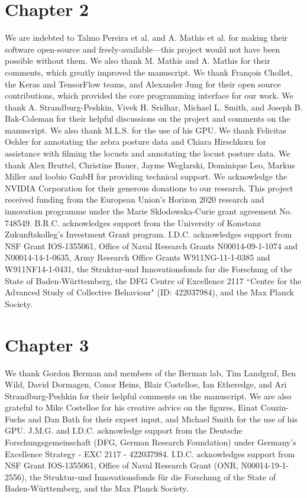 \documentclass[11pt,a4paper,oneside]{book}
\begin{document}
\begin{doublespace}
\section*{Chapter 2}
We are indebted to Talmo Pereira et al. and A. Mathis et al. for making their software open-source and freely-available---this project would not have been possible without them. We also thank M. Mathis and A. Mathis for their comments, which greatly improved the manuscript. We thank Fran\c{c}ois Chollet, the Keras and TensorFlow teams, and Alexander Jung for their open source contributions, which provided the core programming interface for our work. We thank A. Strandburg-Peshkin, Vivek H. Sridhar, Michael L. Smith, and Joseph B. Bak-Coleman for their helpful discussions on the project and comments on the manuscript. We also thank M.L.S. for the use of his GPU. We thank Felicitas Oehler for annotating the zebra posture data and Chiara Hirschkorn for assistance with filming the locusts and annotating the locust posture data. We thank Alex Bruttel, Christine Bauer, Jayme Weglarski, Dominique Leo, Markus Miller and loobio GmbH for providing technical support. We acknowledge the NVIDIA Corporation for their generous donations to our research. This project received funding from the European Union's Horizon 2020 research and innovation programme under the Marie Sklodowska-Curie grant agreement No. 748549. B.R.C. acknowledges support from the University of Konstanz Zukunftskolleg's Investment Grant program. I.D.C. acknowledges support from NSF Grant IOS-1355061, Office of Naval Research Grants N00014-09-1-1074 and N00014-14-1-0635, Army Research Office Grants W911NG-11-1-0385 and W911NF14-1-0431, the Struktur-und Innovationsfonds fur die Forschung of the State of Baden-W\"urttemberg, the DFG Centre of Excellence 2117 “Centre for the Advanced Study of Collective Behaviour" (ID: 422037984), and the Max Planck Society.

\section*{Chapter 3}
We thank Gordon Berman and members of the Berman lab, Tim Landgraf, Ben Wild, David Dormagen, Conor Heins, Blair Costelloe, Ian Etheredge, and Ari Strandburg-Peshkin for their helpful comments on the manuscript. We are also grateful to Mike Costelloe for his creative advice on the figures, Einat Couzin-Fuchs and Dan Bath for their expert input, and Michael Smith for the use of his GPU. J.M.G. and I.D.C. acknowledge support from the Deutsche Forschungsgemeinschaft
(DFG, German Research Foundation) under Germany’s Excellence Strategy - EXC 2117 - 422037984. I.D.C. acknowledges support from NSF Grant IOS-1355061, Office of Naval Research Grant (ONR, N00014-19-1-2556), the Struktur-und Innovationsfonds f\"ur die Forschung of the State of Baden-W\"urttemberg, and the Max Planck Society.



\end{doublespace}
\end{document}
